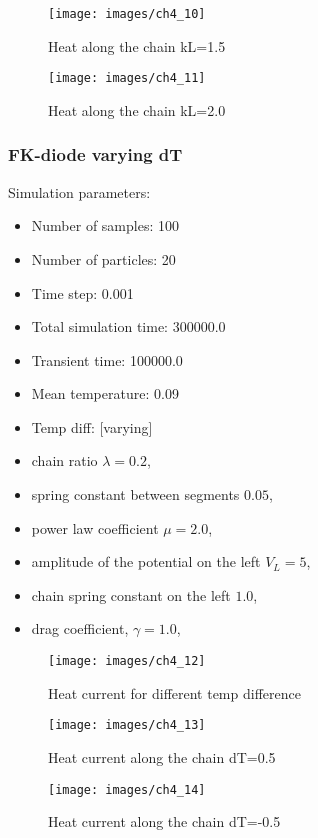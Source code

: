 \begin{figure}[H]
	\centering
	\texttt{[image: images/ch4\_10]}
	\caption{Heat along the chain kL=1.5}
	\label{fig:ch4_10}
\end{figure}

\begin{figure}[H]
	\centering
	\texttt{[image: images/ch4\_11]}
	\caption{Heat along the chain kL=2.0}
	\label{fig:ch4_11}
\end{figure}

\subsubsection{FK-diode varying dT}
Simulation parameters:
\begin{itemize}
	\item Number of samples: 100
	\item Number of particles: 20
	\item Time step: 0.001
	\item Total simulation time: 300000.0
	\item Transient time: 100000.0
	\item Mean temperature: 0.09
	\item Temp diff: [varying]
	\item chain ratio $ \lambda=0.2 $,
	\item spring constant between segments $ 0.05 $,
	\item power law coefficient $ \mu=2.0 $,
	\item amplitude of the potential on the left $ V_{L}=5 $,
	\item chain spring constant on the left $ 1.0 $,
	\item drag coefficient, $ \gamma=1.0 $,
\end{itemize}

\begin{figure}[H]
	\centering
	\texttt{[image: images/ch4\_12]}
	\caption{Heat current for different temp difference}
	\label{fig:ch4_12}
\end{figure}

\begin{figure}[H]
	\centering
	\texttt{[image: images/ch4\_13]}
	\caption{Heat current along the chain dT=0.5}
	\label{fig:ch4_13}
\end{figure}

\begin{figure}[H]
	\centering
	\texttt{[image: images/ch4\_14]}
	\caption{Heat current along the chain dT=-0.5}
	\label{fig:ch4_14}
\end{figure}

